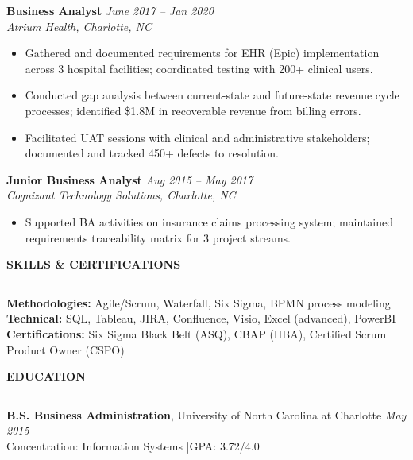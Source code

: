 \documentclass[11pt,a4paper]{article}
\begin{document}
\vspace{4pt}
\noindent\textbf{Business Analyst} \hfill \textit{June 2017 -- Jan 2020}\\
\textit{Atrium Health, Charlotte, NC}
\begin{itemize}
  \item Gathered and documented requirements for EHR (Epic) implementation across 3 hospital facilities; coordinated testing with 200+ clinical users.
  \item Conducted gap analysis between current-state and future-state revenue cycle processes; identified \$1.8M in recoverable revenue from billing errors.
  \item Facilitated UAT sessions with clinical and administrative stakeholders; documented and tracked 450+ defects to resolution.
\end{itemize}

\vspace{4pt}
\noindent\textbf{Junior Business Analyst} \hfill \textit{Aug 2015 -- May 2017}\\
\textit{Cognizant Technology Solutions, Charlotte, NC}
\begin{itemize}
  \item Supported BA activities on insurance claims processing system; maintained requirements traceability matrix for 3 project streams.
\end{itemize}

\vspace{6pt}
\begin{center}\textbf{SKILLS \& CERTIFICATIONS}\end{center}
\rule{\textwidth}{0.4pt}

\noindent\textbf{Methodologies:} Agile/Scrum, Waterfall, Six Sigma, BPMN process modeling\\
\textbf{Technical:} SQL, Tableau, JIRA, Confluence, Visio, Excel (advanced), PowerBI\\
\textbf{Certifications:} Six Sigma Black Belt (ASQ), CBAP (IIBA), Certified Scrum Product Owner (CSPO)

\vspace{6pt}
\begin{center}\textbf{EDUCATION}\end{center}
\rule{\textwidth}{0.4pt}

\noindent\textbf{B.S. Business Administration}, University of North Carolina at Charlotte \hfill \textit{May 2015}\\
Concentration: Information Systems \quad|\quad GPA: 3.72/4.0
\end{document}
